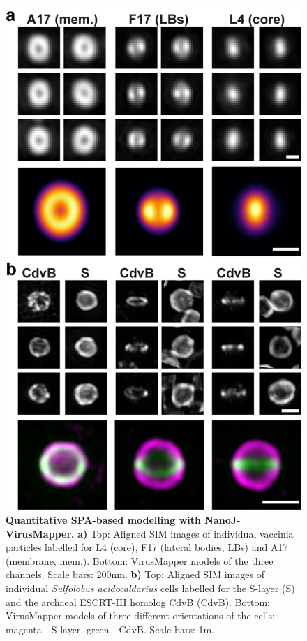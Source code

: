   \begin{figure}[!t]
    \centering
    \includegraphics{Figures/FigureVirusMapper_v4.png}
    \caption{\textbf{Quantitative SPA-based modelling with NanoJ-VirusMapper.} \textbf{a)} Top: Aligned SIM images of individual vaccinia particles labelled for L4 (core), F17 (lateral bodies, LBs) and A17 (membrane, mem.). Bottom: VirusMapper models of the three channels. Scale bars: 200nm. \textbf{b)} Top: Aligned SIM images of individual \emph{Sulfolobus acidocaldarius} cells labelled for the S-layer (S) and the archaeal ESCRT-III homolog CdvB (CdvB). Bottom: VirusMapper models of three different orientations of the cells; magenta - S-layer, green - CdvB. Scale bars: 1\micro m. }
    \label{fig:VirusMapper}
 \end{figure}

